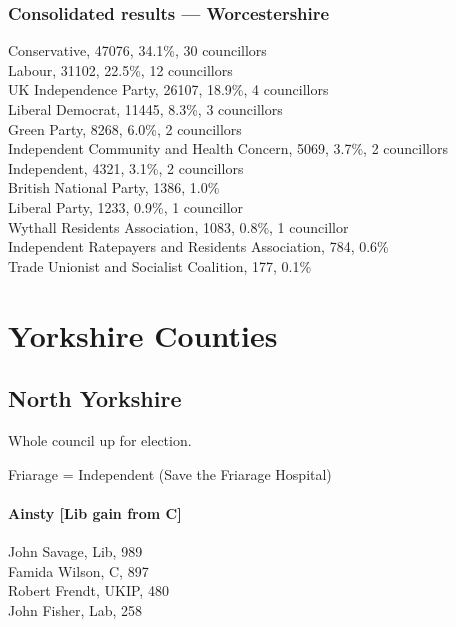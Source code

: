 \documentclass[a4paper,openany,10pt]{book}
\begin{document}
\subsection*{Consolidated results --- Worcestershire}
Conservative, 47076, 34.1\%, 30 councillors\\
Labour, 31102, 22.5\%, 12 councillors\\
UK Independence Party, 26107, 18.9\%, 4 councillors\\
Liberal Democrat, 11445, 8.3\%, 3 councillors\\
Green Party, 8268, 6.0\%, 2 councillors\\
Independent Community and Health Concern, 5069, 3.7\%, 2 councillors\\
Independent, 4321, 3.1\%, 2 councillors\\
British National Party, 1386, 1.0\% \\
Liberal Party, 1233, 0.9\%, 1 councillor\\
Wythall Residents Association, 1083, 0.8\%, 1 councillor\\
Independent Ratepayers and Residents Association, 784, 0.6\% \\
Trade Unionist and Socialist Coalition, 177, 0.1\% \\


\chapter{Yorkshire Counties}

\section{North Yorkshire}

Whole council up for election.

Friarage = Independent (Save the Friarage Hospital)



\subsubsection*{Ainsty \hspace*{\fill}\nolinebreak[1]%
\enspace\hspace*{\fill}
[Lib gain from C]}



John Savage, Lib, 989\\
Famida Wilson, C, 897\\
Robert Frendt, UKIP, 480\\
John Fisher, Lab, 258\\
\end{document}
